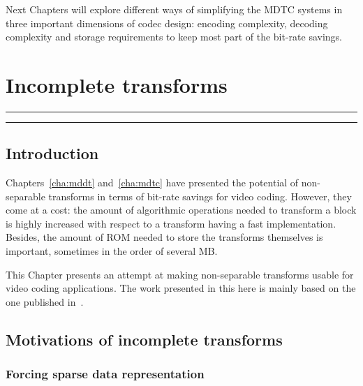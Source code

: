 \documentclass[11pt,a4paper,openright,twoside]{book}
\providecommand{\chaptertoc}{
	\startcontents[chapters]
	\hrule
	\vspace{1em}
	\printcontents[chapters]{}{1}{{\sf\large\bfseries Contents}}
	\hrule
}
\numberwithin{equation}{section} %
\numberwithin{figure}{section} %
\numberwithin{table}{section} %
\begin{document}
Next Chapters will explore different ways of simplifying the \ac{MDTC} systems
in three important dimensions of codec design:
encoding complexity, decoding complexity and storage
requirements to keep most part of the bit-rate savings.

\chapter{Incomplete transforms}
\label{cha:incomplete_transforms}
\chaptertoc

\section{Introduction}
\label{sec:it_introduction}

Chapters~\ref{cha:mddt} and~\ref{cha:mdtc} have presented the potential of
non-separable transforms in terms of bit-rate savings for video coding.
However, they come at a cost:
the amount of algorithmic operations needed to transform a block is highly
increased with respect to a transform having a fast implementation.
Besides, the amount of \acs{ROM} needed to store the transforms themselves is
important, sometimes in the order of several MB.

This Chapter presents an attempt at making non-separable transforms usable for
video coding applications.
The work presented in this here is mainly based on the one published
in~\cite{arrufat-15-inc-transforms}.

\section{Motivations of incomplete transforms}
\label{sec:it_motivations}

\subsection{Forcing sparse data representation}
\label{sub:it_forcing_sparse_data_representation}
\end{document}
